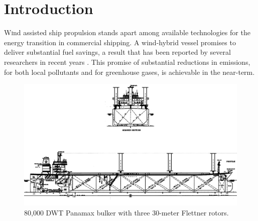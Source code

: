 \documentclass[twoside,twocolumn]{article}
\begin{document}

	
	
	
	
	
	
	\maketitle
	
	
	\printnomenclature
	
	\section{Introduction}
	
	\lettrine[nindent=0em,lines=3]{W}ind assisted ship propulsion stands apart among available technologies for the energy transition in commercial shipping. A wind-hybrid vessel promises to deliver substantial fuel savings, a result that has been reported by several researchers in recent years \cite{Fujiwara05a, Naaijen10, Traut14, Eggers16}. This promise of substantial reductions in emissions, for both local pollutants and for greenhouse gases, is achievable in the near-term.
	
	\begin{figure}[!ht]
		\centering
		\includegraphics[width=\textwidth]{images/Panamax530.png}  %
		\caption{80,000 DWT Panamax bulker with three 30-meter Flettner rotors.}
		\label{fig:Panamax}
	\end{figure}
	
\end{document}
